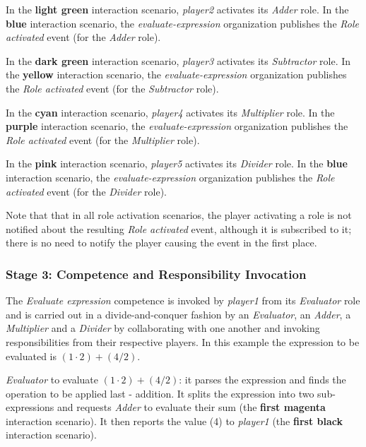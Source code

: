 In the \textbf{light green} interaction scenario, \textit{player2} activates its \textit{Adder} role.
In the \textbf{blue} interaction scenario, the \textit{evaluate-expression} organization publishes the \textit{Role activated} event (for the \textit{Adder} role).

In the \textbf{dark green} interaction scenario, \textit{player3} activates its \textit{Subtractor} role.
In the \textbf{yellow} interaction scenario, the \textit{evaluate-expression} organization publishes the \textit{Role activated} event (for the \textit{Subtractor} role).

In the \textbf{cyan} interaction scenario, \textit{player4} activates its \textit{Multiplier} role.
In the \textbf{purple} interaction scenario, the \textit{evaluate-expression} organization publishes the \textit{Role activated} event (for the \textit{Multiplier} role).

In the \textbf{pink} interaction scenario, \textit{player5} activates its \textit{Divider} role.
In the \textbf{blue} interaction scenario, the \textit{evaluate-expression} organization publishes the \textit{Role activated} event (for the \textit{Divider} role).

Note that that in all role activation scenarios, the player activating a role is not notified about the resulting \textit{Role activated} event, although it is subscribed to it; there is no need to notify the player causing the event in the first place.

\subsubsection*{Stage 3: Competence and Responsibility Invocation}

The \textit{Evaluate expression} competence is invoked by \textit{player1} from its \textit{Evaluator} role and is carried out in a divide-and-conquer fashion by an \textit{Evaluator}, an \textit{Adder}, a \textit{Multiplier} and a \textit{Divider} by collaborating with one another and invoking responsibilities from their respective players.
In this example the expression to be evaluated is $(1\cdot2)+(4/2)$.

\textit{Evaluator} to evaluate $(1\cdot2)+(4/2)$: it parses the expression and finds the operation to be applied last - addition.
It splits the expression into two sub-expressions and requests \textit{Adder} to evaluate their sum (the \textbf{first magenta} interaction scenario).
It then reports the value (4) to \textit{player1} (the \textbf{first black} interaction scenario).

